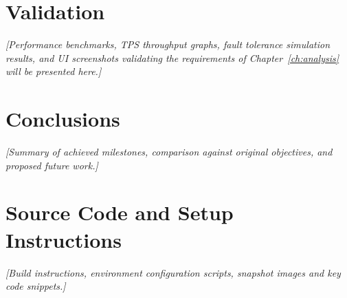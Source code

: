 \documentclass[11pt,a4paper]{memoir}
\begin{document}
\chapter{Validation}\label{ch:validation}
\textit{[Performance benchmarks, TPS throughput graphs, fault tolerance simulation results, and UI screenshots validating the requirements of Chapter~\ref{ch:analysis} will be presented here.]}

\chapter{Conclusions}\label{ch:conclusions}
\textit{[Summary of achieved milestones, comparison against original objectives, and proposed future work.]}

\appendix
\chapter{Source Code and Setup Instructions}\label{ch:appendix}
\textit{[Build instructions, environment configuration scripts, snapshot images and key code snippets.]}
\end{document}

